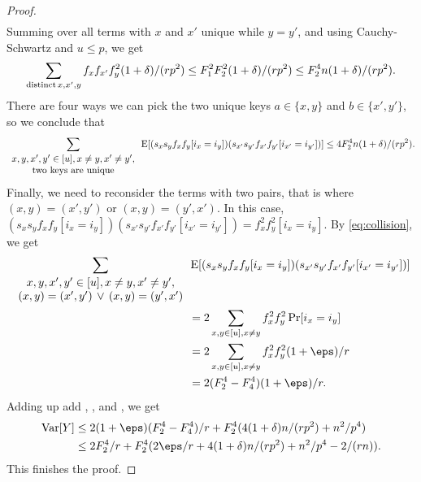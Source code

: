 \begin{proof}
\begin{align*}
    \end{align*}    
    Summing over all terms with $x$ and $x'$ unique while $y=y'$, and
    using Cauchy-Schwartz and $u\leq p$, we get 
    \begin{align*}
        \sum_{{\rm distinct}\,x,x',y} f_xf_{x'}f_y^2 (1 + \delta) /(rp^2) 
            \le F_1^2F_2^2 (1 + \delta)/(rp^2)
            \le F_2^4 n(1 + \delta)/(rp^2).
    \end{align*}
    There are four ways we can pick the two unique keys $a\in \{x,y\}$
    and $b\in \{x',y'\}$, so we conclude that
    \begin{equation}\label{eq:one-pair}
        \sum_{\begin{array}{c}
            x,y,x',y'\in[u], x\neq y, x'\neq y',\\
            {\rm two\ keys\ are\ unique}
        \end{array}}
        \operatorname*{E}[(s_x s_y f_x f_y [i_x = i_y]) (s_{x'} s_{y'} f_{x'} f_{y'}[i_{x'} = i_{y'}])]
            \le 4 F_2^4 n(1 + \delta)/(rp^2) .
    \end{equation}
    Finally, we need to reconsider the terms with two pairs, that
    is where $(x,y)=(x',y')$ or $(x,y)=(y',x')$. In
    this case, $(s_x s_y f_x f_y [i_x = i_y]) (s_{x'} s_{y'} f_{x'} f_{y'}[i_{x'} = i_{y'}]) = f_x^2 f_y^2 [i_x = i_y]$.
    By \cref{eq:collision}, we get 
    \begin{equation}\begin{split}    
        \sum_{\begin{array}{c}
            x,y,x',y'\in[u], x\neq y, x'\neq y',\\
            (x,y)=(x',y')\,\vee\,(x,y)=(y',x')
        \end{array}}&
            \E[(s_x s_y f_x f_y [i_x = i_y]) (s_{x'} s_{y'} f_{x'} f_{y'}[i_{x'} = i_{y'}])]
            \\&=2\sum_{x,y\in[u],x\neq y} f_x^2f_y^2 \Pr[i_x=i_y]
            \\&=2\sum_{x,y\in[u],x\neq y} f_x^2f_y^2 (1 + \eps)/r
            \\&=2(F_2^4 - F_4^4)(1 + \eps)/r .\label{eq:two-pairs}
    \end{split}\end{equation}
    Adding up add , , and
    , we get 
    \begin{align*}
        \Var[Y]
            &\le 2(1 + \eps)(F_2^4 - F_4^4)/r + F_2^4(4(1 + \delta) n / (rp^2) + n^2/p^4)
            \\&\le 2F_2^4/r + F_2^4 (2\eps/r + 4(1 + \delta)n / (rp^2) + n^2/p^4 - 2 /(rn)) .
    \end{align*}
    This finishes the proof.
\end{proof}



